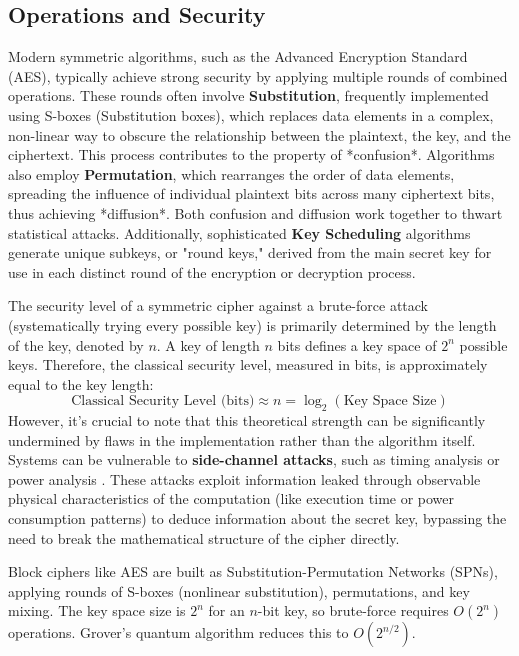 \subsection{Operations and Security}
Modern symmetric algorithms, such as the Advanced Encryption Standard (AES), typically achieve strong security by applying multiple rounds of combined operations. These rounds often involve \textbf{Substitution}, frequently implemented using S-boxes (Substitution boxes), which replaces data elements in a complex, non-linear way to obscure the relationship between the plaintext, the key, and the ciphertext. This process contributes to the property of *confusion*. Algorithms also employ \textbf{Permutation}, which rearranges the order of data elements, spreading the influence of individual plaintext bits across many ciphertext bits, thus achieving *diffusion*. Both confusion and diffusion work together to thwart statistical attacks. Additionally, sophisticated \textbf{Key Scheduling} algorithms generate unique subkeys, or "round keys," derived from the main secret key for use in each distinct round of the encryption or decryption process.

The security level of a symmetric cipher against a brute-force attack (systematically trying every possible key) is primarily determined by the length of the key, denoted by $n$. A key of length $n$ bits defines a key space of $2^n$ possible keys. Therefore, the classical security level, measured in bits, is approximately equal to the key length:
\begin{equation}\label{eq:key_space_ch3}
    \text{Classical Security Level (bits)} \approx n = \log_2(\text{Key Space Size})
\end{equation}
However, it's crucial to note that this theoretical strength can be significantly undermined by flaws in the implementation rather than the algorithm itself. Systems can be vulnerable to \textbf{side-channel attacks}, such as timing analysis \parencite{kocher1996timing} or power analysis \parencite{mangard2007power}. These attacks exploit information leaked through observable physical characteristics of the computation (like execution time or power consumption patterns) to deduce information about the secret key, bypassing the need to break the mathematical structure of the cipher directly.

Block ciphers like AES are built as Substitution-Permutation Networks (SPNs), applying rounds of S-boxes (nonlinear substitution), permutations, and key mixing. The key space size is $2^n$ for an $n$-bit key, so brute-force requires $O(2^n)$ operations. Grover's quantum algorithm reduces this to $O(2^{n/2})$.

